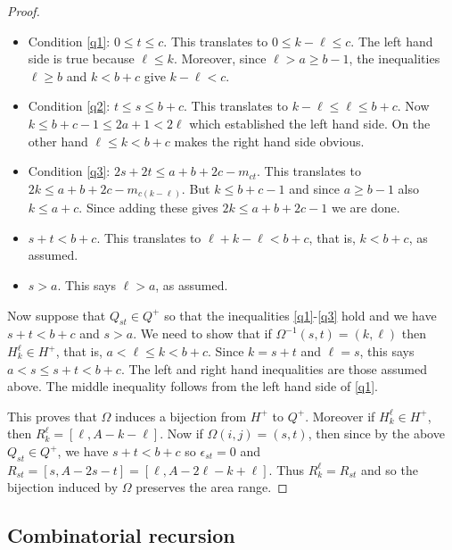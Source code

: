 \documentclass[11pt,reqno]{amsart}
\newcommand{\mms}{_}
\theoremstyle{definition}
\numberwithin{equation}{section}
\begin{document}
\begin{proof}
\begin{enumerate}
\begin{itemize}
\item Condition \eqref{q1}: $0 \leqslant t \leqslant c$.  This translates to $0 \leqslant k-\ell \leqslant c$.  The left hand 
side is true because $\ell\leqslant k$.  Moreover, since $\ell>a \geqslant b-1$, the inequalities $\ell \geqslant b$ and 
$k < b+c$ give $k-\ell<c$.

\item Condition \eqref{q2}: $t \leqslant s \leqslant b+c$.  This translates to $k-\ell \leqslant \ell \leqslant b+c$.  Now 
$k \leqslant b+c-1 \leqslant 2a+1 <2\ell$ which established the left hand side. On the other hand $\ell \leqslant k <b+c$ 
makes the right hand side obvious.

\item Condition \eqref{q3}: $2s+2t \leqslant a+b+2c-m_{ct}$.  This translates to $2k \leqslant a+b+2c-m_{c(k-\ell)}$.  
But $k \leqslant b+c-1$ and since $a \geqslant b-1$ also $k \leqslant a+c$.  Since adding these gives $2k \leqslant a+b+2c-1$
we are done.

\item $s+t < b+c$.  This translates to $\ell+k-\ell<b+c$, that is, $k <b+c$, as assumed.

\item $s>a$. This says $\ell>a$, as assumed.

\end{itemize}

Now suppose that $Q\mms{st} \in Q^+$ so that the inequalities \eqref{q1}-\eqref{q3} hold and we have $s+t<b+c$ and 
$s>a$. We need to show that if $\Omega^{-1}(s,t)=(k,\ell)$ then $H_k^\ell \in H^+$, that is, $a < \ell \leqslant k <b+c$.  
Since $k=s+t$ and $\ell=s$, this says $a < s \leqslant s+t <b+c$.  The left and right hand inequalities are those 
assumed above.  The middle inequality follows from the left hand side of \eqref{q1}.
\end{enumerate}

This proves that $\Omega$ induces a bijection from $H^+$ to $Q^+$. Moreover if $H_k^\ell \in H^+$, then 
$R_k^\ell=[\ell,A-k-\ell]$.  Now if $\Omega(i,j)=(s,t)$, then since by the above $Q\mms{st} \in Q^+$, we have $s+t < b+c$ 
so $\epsilon_{st}=0$ and $R\mms{st} = [s,A-2s-t]=[\ell,A-2\ell-k+\ell]$.  Thus $R_k^\ell=R\mms{st}$ and so the bijection 
induced by $\Omega$ preserves the area range.
\end{proof}

\subsection{Combinatorial recursion}
\label{section.combinatorial recursion}
\end{document}
